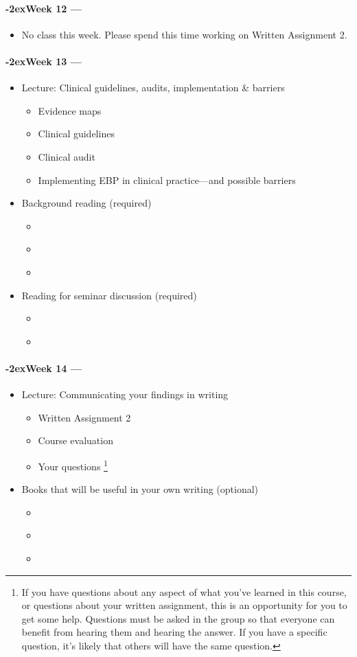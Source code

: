 \documentclass[a4paper, 11pt]{article}
\newcommand{\week}[1]{%
  \paragraph*{\kern-2ex\quad #1 --- \syldate{\today}}%


  \ifdim\wd1=\wd\MONDAY
    \AdvanceDate[7]
  \else
    \AdvanceDate[7]
  \fi
}
\begin{document}
\week{Week 12} 
	\begin{itemize}
	\item No class this week. Please spend this time working on Written Assignment 2.
	\end{itemize}

\week{Week 13} 
\begin{itemize}
\item Lecture: Clinical guidelines, audits, implementation \& barriers
	\begin{itemize}
	\item Evidence maps
	\item Clinical guidelines
	\item Clinical audit
	\item Implementing EBP in clinical practice---and possible barriers
	\end{itemize}
\item Background reading (required)
	\begin{itemize}
	\item \citet{Schooling2017}
	\item \citet{NHS_ChangePractice2007}
	\item \citet{Hargrove2008}
	\end{itemize}
\item Reading for seminar discussion (required)
	\begin{itemize}
	\item \citet{Rosenbek2016}
	\item \citet{Metcalfe2001}
	\end{itemize}
\end{itemize}

\week{Week 14} 
\begin{itemize}
\item Lecture: Communicating your findings in writing
	\begin{itemize}
	\item Written Assignment 2
	\item Course evaluation
	\item Your questions \footnote{If you have questions about any aspect of what you've learned in this course, or questions about your written assignment, this is an opportunity for you to get some help. Questions must be asked in the group so that everyone can benefit from hearing them and hearing the answer. If you have a specific question, it's likely that others will have the same question.}
	\end {itemize}
\item Books that will be useful in your own writing (optional)
	\begin{itemize}
	\item \citet{Cooper2011}
	\item \citet{Nicol2010}
	\item \citet{Nicol2010a}
	\end{itemize}
\end{itemize}
	
	
\newpage


\end{document}
